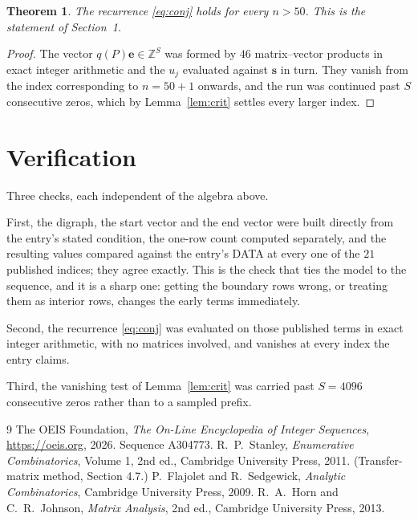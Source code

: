 \documentclass[11pt,a4paper]{article}
\theoremstyle{plain}
\newtheorem{theorem}{Theorem}
\theoremstyle{definition}
\begin{document}
\begin{theorem}
The recurrence \eqref{eq:conj} holds for every $n>50$. This is the statement of
Section~1.
\end{theorem}

\begin{proof}
The vector $q(P)\mathbf{e}\in\mathbb{Z}^{S}$ was formed by $46$ matrix--vector
products in exact integer arithmetic and the $u_j$ evaluated against $\mathbf{s}$ in turn.
They vanish from the index corresponding to $n=50+1$ onwards, and the run was continued
past $S$ consecutive zeros, which by Lemma~\ref{lem:crit} settles every larger index.
\end{proof}

\section{Verification}

Three checks, each independent of the algebra above.

First, the digraph, the start vector and the end vector were built directly from the
entry's stated condition, the one-row count computed separately, and the resulting values
compared against the entry's DATA at every one of the $21$ published indices; they
agree exactly. This is the check that ties the model to the sequence, and it is a sharp one:
getting the boundary rows wrong, or treating them as interior rows, changes the early terms
immediately.

Second, the recurrence \eqref{eq:conj} was evaluated on those published terms in exact
integer arithmetic, with no matrices involved, and vanishes at every index the entry claims.

Third, the vanishing test of Lemma~\ref{lem:crit} was carried past $S=4096$ consecutive
zeros rather than to a sampled prefix.

\begin{thebibliography}{9}
 The OEIS Foundation, \emph{The On-Line Encyclopedia of Integer
Sequences}, \url{https://oeis.org}, 2026. Sequence A304773.
 R.~P.~Stanley, \emph{Enumerative Combinatorics}, Volume 1, 2nd ed.,
Cambridge University Press, 2011. (Transfer-matrix method, Section 4.7.)
 P.~Flajolet and R.~Sedgewick, \emph{Analytic Combinatorics}, Cambridge
University Press, 2009.
 R.~A.~Horn and C.~R.~Johnson, \emph{Matrix Analysis}, 2nd ed., Cambridge
University Press, 2013.
\end{thebibliography}
\end{document}

